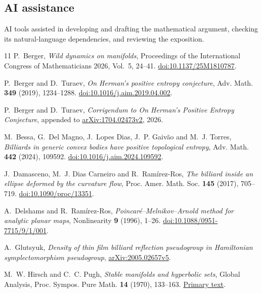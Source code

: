 \documentclass[11pt]{article}
\begin{document}
\subsection*{AI assistance}
AI tools assisted in developing and drafting the mathematical argument,
checking its natural-language dependencies, and reviewing the exposition.

\begin{thebibliography}{11}
P.~Berger, \emph{Wild dynamics on manifolds}, Proceedings of the
International Congress of Mathematicians 2026, Vol.~5, 24--41.
\href{https://doi.org/10.1137/25M1810787}{doi:10.1137/25M1810787}.

P.~Berger and D.~Turaev, \emph{On Herman's positive entropy conjecture},
Adv. Math. \textbf{349} (2019), 1234--1288.
\href{https://doi.org/10.1016/j.aim.2019.04.002}{doi:10.1016/j.aim.2019.04.002}.

P.~Berger and D.~Turaev, \emph{Corrigendum to On Herman's Positive
Entropy Conjecture}, appended to \href{https://arxiv.org/pdf/1704.02473v2#page=53}
{arXiv:1704.02473v2}, 2026.

M.~Bessa, G.~Del Magno, J.~Lopes Dias, J.~P. Gaiv\~ao and M.~J. Torres,
\emph{Billiards in generic convex bodies have positive topological
entropy}, Adv. Math. \textbf{442} (2024), 109592.
\href{https://doi.org/10.1016/j.aim.2024.109592}{doi:10.1016/j.aim.2024.109592}.

J.~Damasceno, M.~J. Dias Carneiro and R.~Ram\'irez-Ros,
\emph{The billiard inside an ellipse deformed by the curvature flow},
Proc. Amer. Math. Soc. \textbf{145} (2017), 705--719.
\href{https://doi.org/10.1090/proc/13351}{doi:10.1090/proc/13351}.

A.~Delshams and R.~Ram\'irez-Ros, \emph{Poincar\'e--Melnikov--Arnold
method for analytic planar maps}, Nonlinearity \textbf{9} (1996), 1--26.
\href{https://doi.org/10.1088/0951-7715/9/1/001}{doi:10.1088/0951-7715/9/1/001}.

A.~Glutsyuk, \emph{Density of thin film billiard reflection pseudogroup
in Hamiltonian symplectomorphism pseudogroup},
\href{https://arxiv.org/abs/2005.02657v5}{arXiv:2005.02657v5}.

M.~W. Hirsch and C.~C. Pugh, \emph{Stable manifolds and hyperbolic
sets}, Global Analysis, Proc. Sympos. Pure Math. \textbf{14} (1970),
133--163. \href{https://escholarship.org/uc/item/2rr3r1pz}{Primary text}.


\end{thebibliography}
\end{document}
